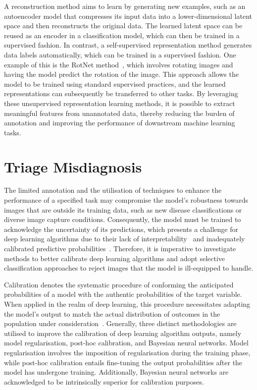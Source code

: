A reconstruction method aims to learn by generating new examples, such as an autoencoder model that compresses its input data into a lower-dimensional latent space and then reconstructs the original data. The learned latent space can be reused as an encoder in a classification model, which can then be trained in a supervised fashion. In contrast, a self-supervised representation method generates data labels automatically, which can be trained in a supervised fashion. One example of this is the RotNet method~\citep{gidaris2018unsupervised}, which involves rotating images and having the model predict the rotation of the image. This approach allows the model to be trained using standard supervised practices, and the learned representations can subsequently be transferred to other tasks. By leveraging these unsupervised representation learning methods, it is possible to extract meaningful features from unannotated data, thereby reducing the burden of annotation and improving the performance of downstream machine learning tasks.

\section{Triage Misdiagnosis}
The limited annotation and the utilisation of techniques to enhance the performance of a specified task may compromise the model's robustness towards images that are outside its training data, such as new disease classifications or diverse image capture conditions. Consequently, the model must be trained to acknowledge the uncertainty of its predictions, which presents a challenge for deep learning algorithms due to their lack of interpretability~\citep{zhang2018visual} and inadequately calibrated predictive probabilities~\citep{gal2016dropout}. Therefore, it is imperative to investigate methods to better calibrate deep learning algorithms and adopt selective classification approaches to reject images that the model is ill-equipped to handle.

Calibration denotes the systematic procedure of conforming the anticipated probabilities of a model with the authentic probabilities of the target variable. When applied in the realm of deep learning, this procedure necessitates adapting the model's output to match the actual distribution of outcomes in the population under consideration~\citep{guo2017calibration}. Generally, three distinct methodologies are utilised to improve the calibration of deep learning algorithm outputs, namely model regularisation, post-hoc calibration, and Bayesian neural networks. Model regularisation involves the imposition of regularisation during the training phase, while post-hoc calibration entails fine-tuning the output probabilities after the model has undergone training. Additionally, Bayesian neural networks are acknowledged to be intrinsically superior for calibration purposes.

